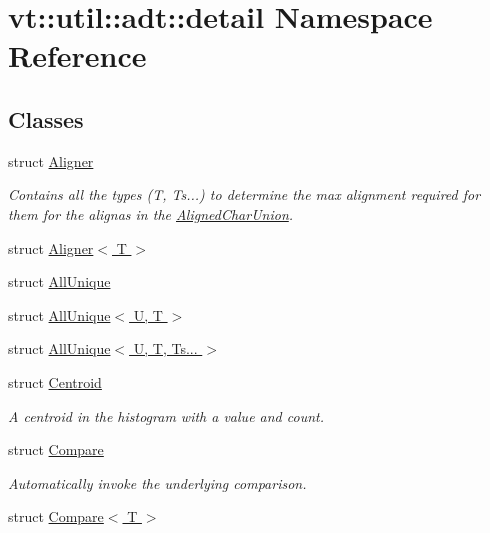 \hypertarget{namespacevt_1_1util_1_1adt_1_1detail}{}\section{vt\+:\+:util\+:\+:adt\+:\+:detail Namespace Reference}
\label{namespacevt_1_1util_1_1adt_1_1detail}
\subsection*{Classes}
\begin{DoxyCompactItemize}
\item 
struct \hyperlink{structvt_1_1util_1_1adt_1_1detail_1_1_aligner}{Aligner}
\begin{DoxyCompactList}\small\item\em Contains all the types (T, Ts...) to determine the max alignment required for them for the alignas in the {\ttfamily \hyperlink{structvt_1_1util_1_1adt_1_1_aligned_char_union}{Aligned\+Char\+Union}}. \end{DoxyCompactList}\item 
struct \hyperlink{structvt_1_1util_1_1adt_1_1detail_1_1_aligner_3_01_t_01_4}{Aligner$<$ T $>$}
\item 
struct \hyperlink{structvt_1_1util_1_1adt_1_1detail_1_1_all_unique}{All\+Unique}
\item 
struct \hyperlink{structvt_1_1util_1_1adt_1_1detail_1_1_all_unique_3_01_u_00_01_t_01_4}{All\+Unique$<$ U, T $>$}
\item 
struct \hyperlink{structvt_1_1util_1_1adt_1_1detail_1_1_all_unique_3_01_u_00_01_t_00_01_ts_8_8_8_01_4}{All\+Unique$<$ U, T, Ts... $>$}
\item 
struct \hyperlink{structvt_1_1util_1_1adt_1_1detail_1_1_centroid}{Centroid}
\begin{DoxyCompactList}\small\item\em A centroid in the histogram with a value and count. \end{DoxyCompactList}\item 
struct \hyperlink{structvt_1_1util_1_1adt_1_1detail_1_1_compare}{Compare}
\begin{DoxyCompactList}\small\item\em Automatically invoke the underlying comparison. \end{DoxyCompactList}\item 
struct \hyperlink{structvt_1_1util_1_1adt_1_1detail_1_1_compare_3_01_t_01_4}{Compare$<$ T $>$}
\item 

\end{DoxyCompactItemize}
